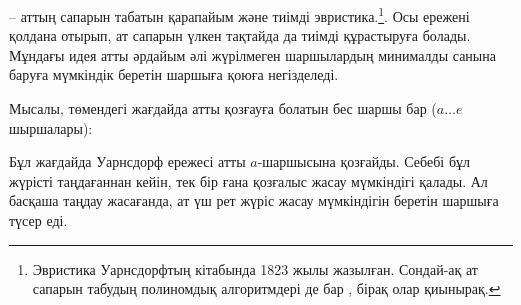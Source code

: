  -- аттың сапарын табатын
қарапайым және тиімді эвристика.\footnote{Эвристика Уарнсдорфтың кітабында \cite{war23} 1823 жылы жазылған. Сондай-ақ ат сапарын табудың полиномдық алгоритмдері де бар \cite{par97}, 
бірақ олар қиынырақ.}.
Осы ережені қолдана отырып, ат сапарын үлкен тақтайда
да тиімді құрастыруға болады.
Мұндағы идея атты әрдайым әлі жүрілмеген шаршылардың минималды санына баруға мүмкіндік беретін шаршыға қоюға негізделеді.

Мысалы, төмендегі жағдайда атты қозғауға болатын бес шаршы бар 
($a \ldots e$ шыршалары):
\begin{center}
\end{center}
Бұл жағдайда Уарнсдорф ережесі атты $a$-шаршысына қозғайды. Себебі бұл жүрісті 
таңдағаннан кейін, тек бір ғана қозғалыс жасау мүмкіндігі қалады.
Ал басқаша таңдау жасағанда, ат үш рет жүріс жасау мүмкіндігін беретін шаршыға түсер еді.


